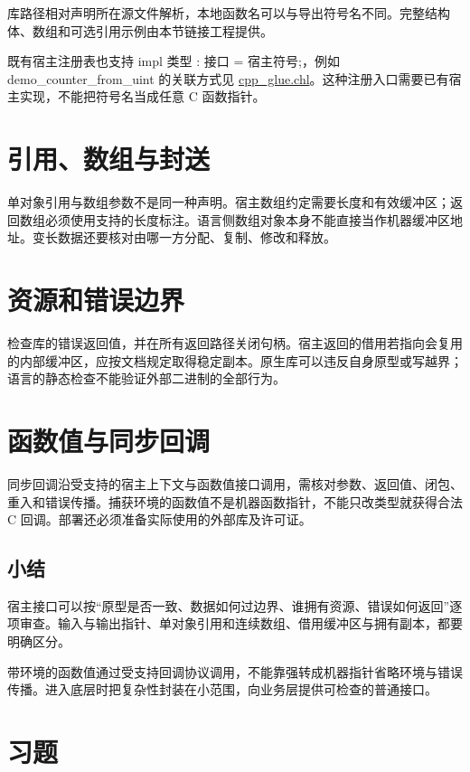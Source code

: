 库路径相对声明所在源文件解析，本地函数名可以与导出符号名不同。完整结构体、数组和可选引用示例由本节链接工程提供。

既有宿主注册表也支持 impl 类型 : 接口 = 宿主符号;，例如 demo\_counter\_from\_uint 的关联方式见 \href{https://github.com/rabbitc999/ChaLi/blob/master/example/samples/cpp_glue.chl}{cpp\_glue.chl}。这种注册入口需要已有宿主实现，不能把符号名当成任意 C 函数指针。

\section{引用、数组与封送}

单对象引用与数组参数不是同一种声明。宿主数组约定需要长度和有效缓冲区；返回数组必须使用支持的长度标注。语言侧数组对象本身不能直接当作机器缓冲区地址。变长数据还要核对由哪一方分配、复制、修改和释放。

\section{资源和错误边界}

检查库的错误返回值，并在所有返回路径关闭句柄。宿主返回的借用若指向会复用的内部缓冲区，应按文档规定取得稳定副本。原生库可以违反自身原型或写越界；语言的静态检查不能验证外部二进制的全部行为。

\section{函数值与同步回调}

同步回调沿受支持的宿主上下文与函数值接口调用，需核对参数、返回值、闭包、重入和错误传播。捕获环境的函数值不是机器函数指针，不能只改类型就获得合法 C 回调。部署还必须准备实际使用的外部库及许可证。

\subsection*{小结}

宿主接口可以按“原型是否一致、数据如何过边界、谁拥有资源、错误如何返回”逐项审查。输入与输出指针、单对象引用和连续数组、借用缓冲区与拥有副本，都要明确区分。

带环境的函数值通过受支持回调协议调用，不能靠强转成机器指针省略环境与错误传播。进入底层时把复杂性封装在小范围，向业务层提供可检查的普通接口。

\section{习题}

